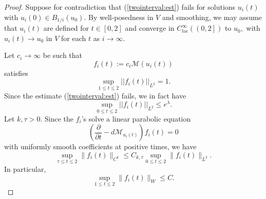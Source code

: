 \documentclass[12pt]{amsart}
\newcommand{\calM}{\mathcal{M}}
\newcommand{\LB}{\left[}
\newcommand{\RB}{\right]}
\newcommand{\p}{{ \partial}}
\renewcommand{\1}{{\mathbf 1}}
\renewcommand{\p}{{\partial}}
\newcommand{\eps}{{\varepsilon}}
\theoremstyle{others}
\numberwithin{equation}{section}
\begin{document}
\begin{proof}%

Suppose for contradiction that %
(\ref{twointerval:est}) fails for solutions $u_i(t)$ with $u_i(0) \in B_{1/i}(u_0).$ By well-posedness in $V$ and smoothing, we may assume that $u_i(t)$ are defined for $t \in \LB 0, 2\RB$ and converge in $C^\infty_{loc}\left( \left( 0 , 2 \RB \right)$ to $u_0,$ with $u_i(t) \to u_0$ in $V$ for each $t$ as $i \to \infty.$ 

Let $c_i \to \infty $ be such that
$$f_i(t) := c_i \calM(u_i(t))$$
satisfies
\begin{equation}\label{fiL2equalsone}
\sup_{1 \leq t \leq 2} ||f_i(t)||_{L^2} = 1.
\end{equation}
Since the estimate (\ref{twointerval:est}) fails, we in fact have
\begin{equation}\label{fiboundedinL2}
\sup_{0 \leq t \leq 2} || f_i(t) ||_{L^2} \leq e^{\lambda}.
\end{equation}
Let $k, \tau > 0.$
Since the $f_i$'s solve a linear parabolic equation
\begin{equation}\label{fievolution}
    \left( \frac{\p}{\p t} - d\calM_{u_i(t)} \right) f_i(t) = 0
\end{equation}
with uniformly smooth coefficients at positive times, we have
\begin{equation*}
\sup_{\tau \leq t \leq 2} \| f_i(t) \|_{C^k} \leq C_{k,\tau} \sup_{0 \leq t \leq 2} \| f_i(t) \|_{L^2}.
\end{equation*}
In particular,
\begin{equation}\label{L2controlsV}
\sup_{1 \leq t \leq 2} \| f_i(t) \|_{W} \leq C.
\end{equation}


\end{proof}
\end{document}
